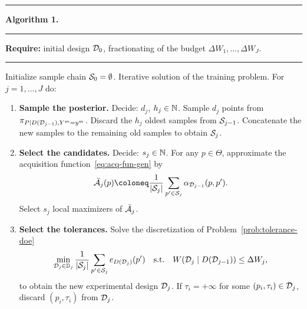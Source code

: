 \par\noindent\rule[1mm]{\textwidth}{0.4pt}
 \makeatletter{}\makeatother\label{algo:AL}
\large{\textbf{Algorithm 1.} } \normalsize
\par\noindent\rule[2mm]{\textwidth}{0.2pt}
\textbf{Require:} initial design $\mathcal D_0$, fractionating of the budget $\Delta W_1,\dots, \Delta W_J$.
\par\noindent\rule[2mm]{\textwidth}{0.2pt}
Initialize sample chain $\mathcal S_0 = \emptyset$. \newline
Iterative solution of the training problem.
For $j =1, \dots, J$ do: 
\begin{enumerate}
    \item \textbf{Sample the posterior.} \newline
    Decide: $d_j$, $h_j \in \mathbb N$. \newline
    Sample $d_j$ points from $\pi_{P \mid D(\mathcal D_{j-1}), Y^m = y^m}$. \newline
    Discard the $h_j$ oldest samples from $\mathcal S_{j-1}$. \newline
    Concatenate the new samples to the remaining old samples to obtain $\mathcal S_j$.

    \item \textbf{Select the candidates.} \newline 
    Decide: $s_j \in \mathbb N$. \newline
    For any $p\in \Theta$, approximate the acquisition function~\ref{eq:acq-fun-gen} by
    \begin{equation}\label{eq:acq-fun-disc}
        \bar{\mc A}_j(p) \coloneq \frac{1}{|\mc S_j|}\sum_{p' \in \mc S_j} \alpha_{\mc D_{j-1}}(p, p') .
    \end{equation}
    Select $s_j$  local maximizers of $\bar{\mathcal A}_j$.

    \item \textbf{Select the tolerances.} \newline
    Solve the discretization of Problem~\ref{prob:tolerance-doe}
    \begin{equation}\label{prob:discrete-tol}       
        \min_{\mathcal D_{j} \in \mathbb D_j} \frac{1}{|\mathcal S_j|} \sum_{p' \in \mathcal S_j} e_{D(\mathcal D_j)}(p')  \quad \text{s.t.} 
        \quad W(\mathcal D_{j} \mid D(\mathcal D_{j-1}) ) \le \Delta W_j, 
    \end{equation} to obtain the new experimental design $\mathcal D_j $. \newline
    If $\tau_i = +\infty$ for some $(p_i, \tau_i) \in \mathcal D_j $, discard $(p_i, \tau_i) $ from $\mathcal D_j $.


\end{enumerate}
